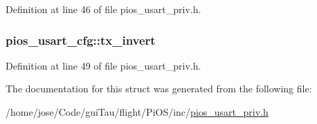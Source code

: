 Definition at line 46 of file pios\-\_\-usart\-\_\-priv.\-h.

\hypertarget{structpios__usart__cfg_afc7c29e0ea546f0e5ed89b0063a51198}{
\subsubsection[{tx\-\_\-invert}]{ pios\-\_\-usart\-\_\-cfg\-::tx\-\_\-invert}}\label{structpios__usart__cfg_afc7c29e0ea546f0e5ed89b0063a51198}


Definition at line 49 of file pios\-\_\-usart\-\_\-priv.\-h.



The documentation for this struct was generated from the following file\-:\begin{DoxyCompactItemize}
\item 
/home/jose/\-Code/gui\-Tau/flight/\-Pi\-O\-S/inc/\hyperlink{pios__usart__priv_8h}{pios\-\_\-usart\-\_\-priv.\-h}\end{DoxyCompactItemize}

